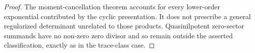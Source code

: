 \begin{proof}
  The moment-cancellation theorem accounts for every lower-order exponential
  contributed by the cyclic presentation.  It does not prescribe a general
  regularized determinant unrelated to those products.  Quasinilpotent
  zero-sector summands have no non-zero zero divisor and so remain outside the
  asserted classification, exactly as in the trace-class case.
\end{proof}
